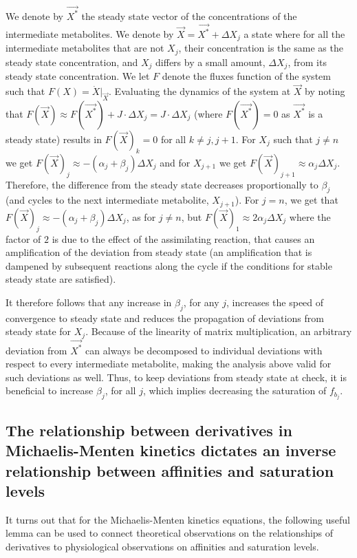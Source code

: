  We denote by $\vec{X^*}$ the steady state vector of the concentrations of the intermediate metabolites.
 We denote by $\vec{X}=\vec{X^*}+\Delta X_j$ a state where for all the intermediate metabolites that are not $X_j$, their concentration is the same as the steady state concentration, and $X_j$ differs by a small amount, $\Delta X_j$, from its steady state concentration.
 We let $F$ denote the fluxes function of the system such that $F(X)=\dot{X}\vert_{\vec{X}}$.
 Evaluating the dynamics of the system at $\vec{X}$ by noting that $F(\vec{X})\approx F(\vec{X^*})+J\cdot\Delta X_j=J\cdot\Delta X_j$ (where $F(\vec{X^*})=0$ as $\vec{X^*}$ is a steady state) results in $F(\vec{X})_k=0$ for all $k\neq j,j+1$.
 For $X_j$ such that $j\neq n$ we get $F(\vec{X})_j\approx -(\alpha_j+\beta_j)\Delta X_j$ and for $X_{j+1}$ we get $F(\vec{X})_{j+1}\approx \alpha_{j}\Delta X_j$.
 Therefore, the difference from the steady state decreases proportionally to $\beta_j$ (and cycles to the next intermediate metabolite, $X_{j+1}$).
 For $j=n$, we get that $F(\vec{X})_j\approx -(\alpha_j+\beta_j)\Delta X_j$, as for $j\neq n$, but $F(\vec{X})_{1}\approx 2\alpha_{j}\Delta X_j$ where the factor of $2$ is due to the effect of the assimilating reaction, that causes an amplification of the deviation from steady state (an amplification that is dampened by subsequent reactions along the cycle if the conditions for stable steady state are satisfied).

 It therefore follows that any increase in $\beta_j$, for any $j$, increases the speed of convergence to steady state and reduces the propagation of deviations from steady state for $X_j$.
 Because of the linearity of matrix multiplication, an arbitrary deviation from $\vec{X^*}$ can always be decomposed to individual deviations with respect to every intermediate metabolite, making the analysis above valid for such deviations as well.
 Thus, to keep deviations from steady state at check, it is beneficial to increase $\beta_j$, for all $j$, which implies decreasing the saturation of $f_{b_j}$.


    \subsection{The relationship between derivatives in Michaelis-Menten kinetics dictates an inverse relationship between affinities and saturation levels}
    It turns out that for the Michaelis-Menten kinetics equations, the following useful lemma can be used to connect theoretical observations on the relationships of derivatives to physiological observations on affinities and saturation levels.

